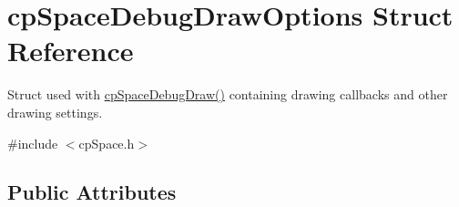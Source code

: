 \hypertarget{structcp_space_debug_draw_options}{}\section{cp\+Space\+Debug\+Draw\+Options Struct Reference}
\label{structcp_space_debug_draw_options}


Struct used with \hyperlink{group__cp_space_gaa1233930591cb32d25852da2cbe76680}{cp\+Space\+Debug\+Draw()} containing drawing callbacks and other drawing settings.  




{\ttfamily \#include $<$cp\+Space.\+h$>$}

\subsection*{Public Attributes}
